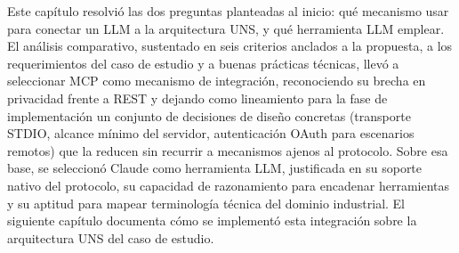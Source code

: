 Este capítulo resolvió las dos preguntas planteadas al inicio: qué mecanismo usar para conectar un LLM a la arquitectura UNS, y qué herramienta LLM emplear. El análisis comparativo, sustentado en seis criterios anclados a la propuesta, a los requerimientos del caso de estudio y a buenas prácticas técnicas, llevó a seleccionar MCP como mecanismo de integración, reconociendo su brecha en privacidad frente a REST y dejando como lineamiento para la fase de implementación un conjunto de decisiones de diseño concretas (transporte STDIO, alcance mínimo del servidor, autenticación OAuth para escenarios remotos) que la reducen sin recurrir a mecanismos ajenos al protocolo. Sobre esa base, se seleccionó Claude como herramienta LLM, justificada en su soporte nativo del protocolo, su capacidad de razonamiento para encadenar herramientas y su aptitud para mapear terminología técnica del dominio industrial. El siguiente capítulo documenta cómo se implementó esta integración sobre la arquitectura UNS del caso de estudio.